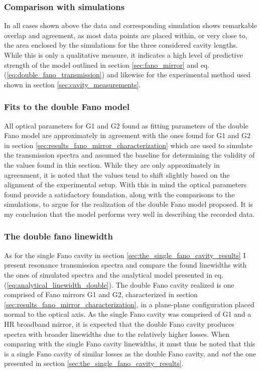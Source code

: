 \subsubsection*{Comparison with simulations}

In all cases shown above the data and corresponding simulation shows remarkable overlap and agreement, as most data points are placed within, or very close to, the area enclosed by the simulations for the three considered cavity lengths. While this is only a qualitative measure, it indicates a high level of predictive strength of the model outlined in section \ref{sec:fano_mirror} and eq. (\ref{eq:double_fano_transmission}) and likewise for the experimental method used shown in section \ref{sec:cavity_measurements}.

\subsubsection*{Fits to the double Fano model}
 
All optical parameters for G1 and G2 found as fitting parameters of the double Fano model are approximately in agreement with the ones found for G1 and G2 in section \ref{sec:results_fano_mirror_characterization} which are used to simulate the transmission spectra and assumed the baseline for determining the validity of the values found in this section. While they are only approximately in agreenment, it is noted that the values tend to shift slightly based on the alignment of the experimental setup. With this in mind the optical parameters found provide a satisfactory foundation, along with the comparisons to the simulations, to argue for the realization of the double Fano model proposed. It is my conclusion that the model performs very well in describing the recorded data. 

\subsubsection{The double fano linewidth}

As for the single Fano cavity in section \ref{sec:the_single_fano_cavity_results} I present resonance transmission spectra and compare the found linewidths with the ones of simulated spectra and the analytical model presented in eq. (\ref{eq:analytical_linewidth_double}). The double Fano cavity realized is one comprised of Fano mirrors G1 and G2, characterized in section \ref{sec:results_fano_mirror_characterization}, in a plane-plane configuration placed normal to the optical axis. As the single Fano cavity was comprised of G1 and a HR broadband mirror, it is expected that the double Fano cavity produces spectra with broader linewidths due to the relatively higher losses. When comparing with the single Fano cavity linewidths, it must thus be noted that this is a single Fano cavity of similar losses as the double Fano cavity, and \emph{not} the one presented in section \ref{sec:the_single_fano_cavity_results}.

